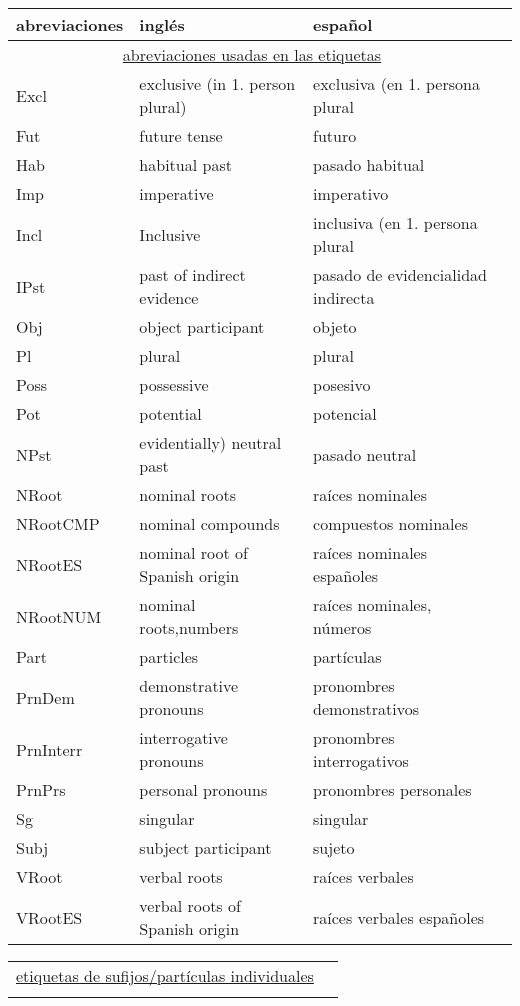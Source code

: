 \documentclass[a4paper,10pt]{scrartcl}
\begin{document}
\begin{center}
\begin{tabular}{llll}
abreviaciones & ingl\'es & espa\~nol\\ \midrule
\multicolumn{3}{c}{\underline{abreviaciones usadas en las etiquetas}}\\ \addlinespace
Excl & exclusive (in 1. person plural) & exclusiva (en 1. persona plural\\
Fut& future tense & futuro \\
Hab& habitual past & pasado habitual \\
Imp& imperative & imperativo \\
Incl& Inclusive & inclusiva (en 1. persona plural\\
IPst& past of indirect evidence & pasado de evidencialidad indirecta \\
Obj& object participant & objeto \\
Pl& plural & plural \\
Poss& possessive & posesivo \\
Pot& potential & potencial \\
NPst& evidentially) neutral past & pasado neutral \\
NRoot & nominal roots & ra\'ices nominales\\
NRootCMP & nominal compounds & compuestos nominales \\
NRootES & nominal root of Spanish origin & ra\'ices nominales espa\~noles\\
NRootNUM & nominal roots,numbers & ra\'ices nominales, n\'umeros\\
Part & particles & part\'iculas\\
PrnDem & demonstrative pronouns & pronombres demonstrativos \\
PrnInterr & interrogative pronouns & pronombres interrogativos\\
PrnPrs & personal pronouns & pronombres personales\\
Sg & singular & singular \\
Subj& subject participant & sujeto \\ 
VRoot & verbal roots & ra\'ices verbales\\
VRootES & verbal roots of Spanish origin & ra\'ices verbales espa\~noles\\
\end{tabular}

\begin{tabular}{llll}
\multicolumn{3}{c}{\underline{etiquetas de sufijos/part\'iculas individuales}}\\ \addlinespace


\end{tabular}
\end{center}
\end{document}
